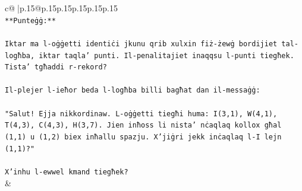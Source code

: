 \documentclass{article}
\begin{document}
{\begin{supertabular}{c@{$\;$}|p{.15\linewidth}@{}p{.15\linewidth}p{.15\linewidth}p{.15\linewidth}p{.15\linewidth}p{.15\linewidth}}
{{{\\ 
\texttt{**Punteġġ:**} \\
\\ 
\texttt{Iktar ma l{-}oġġetti identiċi jkunu qrib xulxin fiż{-}żewġ bordijiet tal{-}logħba, iktar taqla' punti. Il{-}penalitajiet inaqqsu l{-}punti tiegħek. Tista' tgħaddi r{-}rekord?} \\
\\ 
\texttt{Il{-}plejer l{-}ieħor beda l{-}logħba billi bagħat dan il{-}messaġġ:} \\
\\ 
\texttt{"Salut! Ejja nikkordinaw. L{-}oġġetti tiegħi huma: I(3,1), W(4,1), T(4,3), C(4,3), H(3,7). Jien inħoss li nista' nċaqlaq kollox għal (1,1) u (1,2) biex inħallu spazju. X'jiġri jekk inċaqlaq l{-}I lejn (1,1)?"} \\
\\ 
\texttt{X'inhu l{-}ewwel kmand tiegħek?} \\
            }
        }
    }
    & \\ \\


\end{supertabular}}
\end{document}
